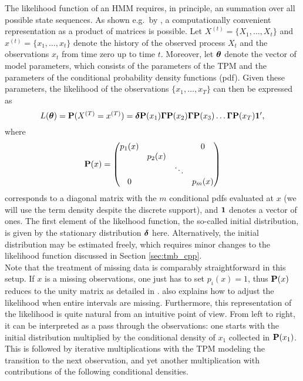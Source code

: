 \documentclass[bimj,fleqn]{w-art}\usepackage[]{graphicx}\usepackage[]{color}
\newcommand{\bcp}{{\bf P}}
\newcommand{\bgamma}{\mbox{\boldmath $\Gamma$}}
\newcommand{\btheta}{\mbox{\boldmath $\theta$}}
\newcommand{\bfdelta}{\mbox{\boldmath $\delta$}}
\newcommand{\bone}{{\bf 1}}
\theoremstyle{plain}
\theoremstyle{definition}
\begin{document}
The likelihood function of an HMM requires, in principle, an summation over all possible state sequences. As shown e.g.~by \citet[p.~37]{zucchini}, a computationally convenient representation as a product of matrices is possible. Let $X^{(t)} = \{X_1, \ldots, X_t \}$ and $x^{(t)} = \{x_1, \ldots, x_t \}$ denote the history of the observed process $X_t$ and the observations $x_t$ from time zero up to time $t$. Moreover, let $\btheta$ denote the vector of model parameters, which consists of the parameters of the TPM and the parameters of the conditional probability density functions (pdf). Given these parameters, the likelihood of the observations $\{x_1, \ldots, x_T \}$ can then be expressed as
\begin{equation}
\label{eq:hmm_likelihood}
L($\btheta$) = \bcp(X^{(T)} = x^{(T)}) = \bfdelta \bcp(x_1) \bgamma \bcp(x_2) \bgamma \bcp(x_3) \ldots \bgamma \bcp(x_T) \bone',
\end{equation}
where
\begin{equation*}
\bcp(x) = \begin{pmatrix}
p_1(x)    &         &         & 0\\
          & p_2(x)  &         &\\
          &         & \ddots  &\\
0         &         &         & p_m(x)
\end{pmatrix}
\end{equation*}
corresponds to a diagonal matrix with the $m$ conditional pdfs evaluated at $x$ (we will use the term density despite the discrete support), and $\bone$ denotes a vector of ones. The first element of the likelhood function, the so-called initial distribution, is given by the stationary distribution $\bfdelta$ here. Alternatively, the initial distribution may be estimated freely, which requires minor changes to the likelihood function discussed in Section \ref{sec:tmb_cpp}.\\
Note that the treatment of missing data is comparably straightforward in this setup. If $x$ is a missing observations, one just has to set $p_i(x) =  1$, thus $\bcp(x)$ reduces to the unity matrix as detailed in \citet[p. ~40]{zucchini}.
\citet[p. ~41]{zucchini} also explains how to adjust the likelihood when entire intervals are missing. Furthermore, this representation of the likelihood is quite natural from an intuitive point of view. From left to right, it can be interpreted as a pass through the observations: one starts with the initial distribution multiplied by the conditional density of $x_1$ collected in $\bcp(x_1)$. This is followed by iterative multiplications with the TPM modeling the transition to the next observation, and yet another multiplication with contributions of the following conditional densities.
\end{document}
